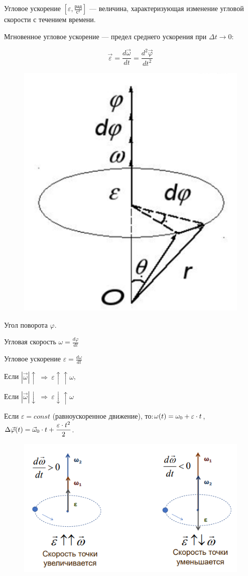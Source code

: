\begin{definition}
    Угловое ускорение $[\varepsilon, \frac{рад}{с^2}]$ — величина, характеризующая изменение угловой скорости с течением времени.
\end{definition}

\begin{definition}
    Мгновенное угловое ускорение — предел среднего ускорения при $\Delta t\to0$:

    $$\vec\varepsilon=\frac{d\vec\omega}{dt}=\frac{d^2\vec\varphi}{dt^2}$$
\end{definition}

\begin{figure}[h]
    \centering
    \includegraphics[width=0.3\linewidth]{imgs/q2i1.png}
\end{figure}

Угол поворота $\varphi$.

Угловая скорость $\omega=\frac{d\varphi}{dt}$

Угловое ускорение $\varepsilon=\frac{d\omega}{dt}$

Если $|\vec\omega|\uparrow\ \Rightarrow\ \varepsilon\uparrow\uparrow\omega$,

Если $|\vec\omega|\downarrow\ \Rightarrow\ \varepsilon\downarrow\uparrow\omega$

Если $\varepsilon=const$ (равноускоренное движение), то:$\displaystyle\\ \omega(t)=\omega_0+\varepsilon\cdot t$, $\displaystyle\\\Delta\vec\varphi(t)=\vec\omega_0\cdot t+\frac{\varepsilon\cdot t^2}{2}$.

\begin{figure}[h]
    \centering
    \includegraphics[width=0.5\linewidth]{imgs/q2i2.png}
\end{figure}

